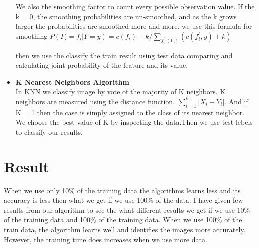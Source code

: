 \documentclass{article}
\begin{document}
\begin{itemize}
        We also the smoothing factor to count every possible observation value.  If the k = 0, the smoothing probabilities are un-smoothed, and as the k grows larger the probabilities are smoothed more and more.  we use this formula for smoothing $P(F_i=f_i|Y=y) = c(f_i) + k/ \sum_{f_{i}^l \in {0,1}} (c(f_{i}^l,y)+k) $
        
        then we use the classify the train result using test data comparing and calculating joint probability of the feature and its value.
        
        \item \textbf{K Nearest Neighbors Algorithm} \\
        \qquad In KNN we classify image by vote of the majority of K neighbors. K neighbors are measured using the distance function.  $\sum_{i=1}^k |X_i-Y_i|$.  And if K = 1 then the case is simply assigned to the class of its nearest neighbor.  We choose the best value of K by inspecting the data.Then we use test lebels to classify our results. 
    \end{itemize}
    
        
        
    
        
        
\section{Result}
   
        When we use only 10\% of the training data the algorithms learns less and its accuracy is less then what we get if we use 100\% of the data.  I have given few results from our algorithm to see the what different results we get if we use 10\% of the training data and 100\% of the training data.  When we use 100\% of the train data, the algorithm learns well and identifies the images more accurately.  However, the training time does increases when we use more data.\\
        
        
        
\end{document}
